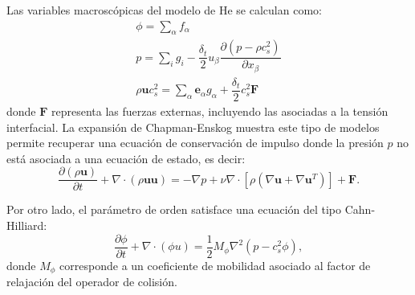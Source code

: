Las variables macrosc\'opicas del modelo de He se calculan como:
\begin{equation}
	\begin{gathered}
		\phi = \sum_{\alpha} f_{\alpha} \\
		p = \sum_i g_i - \dfrac{\delta_t}{2} u_{\beta} \dfrac{\partial(p - \rho c_s^2)}{\partial x_{\beta}} \\
		\rho \bm{u}c_s^2 = \sum_{\alpha} \bm{e}_{\alpha}g_{\alpha} + \dfrac{\delta_t}{2}c_s^2 \bm{F}
	\end{gathered}
	\label{eq:he_macro_variables}
\end{equation}
donde $\bm{F}$ representa las fuerzas externas, incluyendo las asociadas a la tensi\'on interfacial. La expansi\'on de Chapman-Enskog muestra este tipo de modelos permite recuperar una ecuaci\'on de conservaci\'on de impulso donde la presi\'on $p$ no est\'a asociada a una ecuaci\'on de estado, es decir:
\begin{equation}
	\dfrac{\partial (\rho \bm{u})}{\partial t} + \nabla \cdot (\rho \bm{uu})  = -\nabla p  + \nu \nabla \cdot \left[ \rho (\nabla\bm{u} + \nabla \bm{u}^T) \right] + \bm{F}.
\end{equation}

Por otro lado, el par\'ametro de orden satisface una ecuaci\'on del tipo Cahn-Hilliard:
\begin{equation}
	\dfrac{\partial \phi}{\partial t} + \nabla \cdot (\phi \bm{}u) = \dfrac{1}{2} M_{\phi} \nabla^2 (p - c_s^2 \phi),
\end{equation}
donde $M_{\phi}$ corresponde a un coeficiente de mobilidad asociado al factor de relajaci\'on del operador de colisi\'on.



